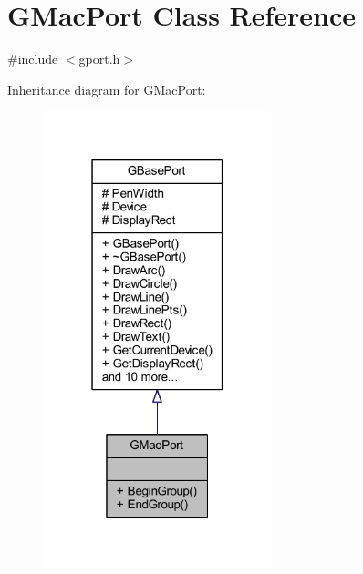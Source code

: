 \hypertarget{class_g_mac_port}{}\section{G\+Mac\+Port Class Reference}
\label{class_g_mac_port}


{\ttfamily \#include $<$gport.\+h$>$}



Inheritance diagram for G\+Mac\+Port\+:\nopagebreak
\begin{figure}[H]
\begin{center}
\leavevmode
\includegraphics[width=187pt]{class_g_mac_port__inherit__graph}
\end{center}
\end{figure}


